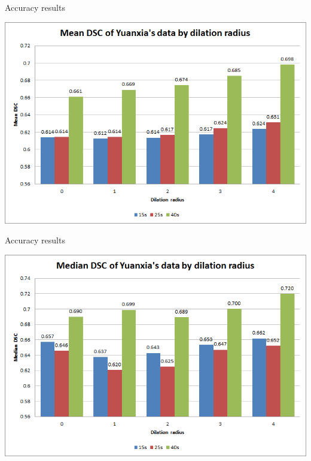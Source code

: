 \documentclass[14pt,xcolor=dvipsnames]{beamer}
\begin{document}
\begin{frame}[fragile,t]{Accuracy results}
	\begin{center}
		\includegraphics[width=\paperheight]{yuanxia_mean_dsc}
	\end{center}
\end{frame}

\begin{frame}[fragile,t]{Accuracy results}
	\begin{center}
		\includegraphics[width=\paperheight]{yuanxia_median_dsc}
	\end{center}
\end{frame}
\end{document}
